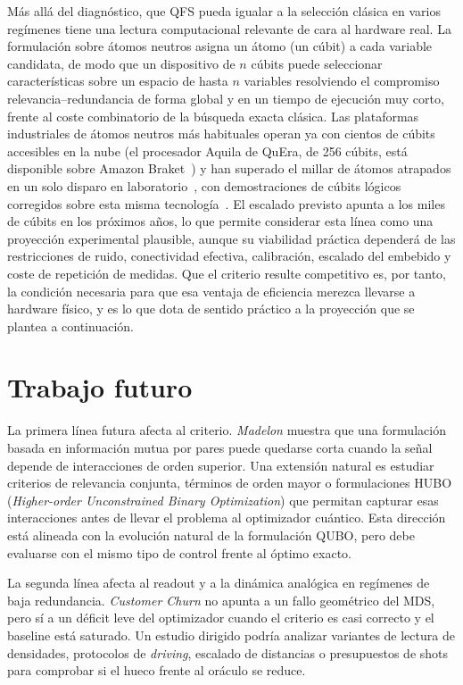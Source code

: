 Más allá del diagnóstico, que QFS pueda igualar a la selección clásica en
varios regímenes tiene una lectura computacional relevante de cara al
hardware real. La formulación sobre átomos neutros asigna un átomo (un
cúbit) a cada variable candidata, de modo que un dispositivo de $n$
cúbits puede seleccionar características sobre un espacio de hasta $n$
variables resolviendo el compromiso relevancia--redundancia de forma
global y en un tiempo de ejecución muy corto, frente al coste
combinatorio de la búsqueda exacta clásica. Las plataformas industriales
de átomos neutros más habituales operan ya con cientos de cúbits
accesibles en la nube (el procesador Aquila de QuEra, de 256 cúbits, está
disponible sobre Amazon Braket~\cite{wurtz2023}) y han superado el millar
de átomos atrapados en un solo disparo en laboratorio~\cite{pasqal2024},
con demostraciones de cúbits lógicos corregidos sobre esta misma
tecnología~\cite{bluvstein2024}. El escalado previsto apunta a los miles
de cúbits en los próximos años, lo que permite considerar esta línea como
una proyección experimental plausible, aunque su viabilidad práctica
dependerá de las restricciones de ruido, conectividad efectiva,
calibración, escalado del embebido y coste de repetición de medidas. Que el criterio resulte competitivo es, por
tanto, la condición necesaria para que esa ventaja de eficiencia merezca
llevarse a hardware físico, y es lo que dota de sentido práctico a la
proyección que se plantea a continuación.

\section{Trabajo futuro}

La primera línea futura afecta al criterio. \textit{Madelon} muestra que
una formulación basada en información mutua por pares puede quedarse
corta cuando la señal depende de interacciones de orden superior. Una
extensión natural es estudiar criterios de relevancia conjunta,
términos de orden mayor o formulaciones HUBO (\textit{Higher-order
Unconstrained Binary Optimization}) que permitan capturar esas
interacciones antes de llevar el problema al optimizador cuántico. Esta
dirección está alineada con la evolución natural de la formulación QUBO,
pero debe evaluarse con el mismo tipo de control frente al óptimo exacto.

La segunda línea afecta al readout y a la dinámica analógica en regímenes
de baja redundancia. \textit{Customer Churn} no apunta a un fallo
geométrico del MDS, pero sí a un déficit leve del optimizador cuando el
criterio es casi correcto y el baseline está saturado. Un estudio
dirigido podría analizar variantes de lectura de densidades, protocolos
de \textit{driving}, escalado de distancias o presupuestos de shots para
comprobar si el hueco frente al oráculo se reduce.

